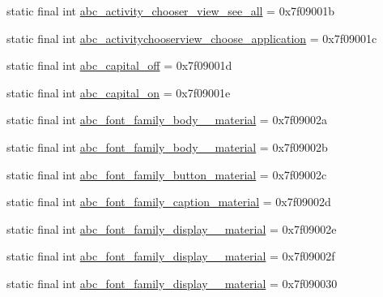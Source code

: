 \begin{CompactItemize}
\item 
static final int \hyperlink{classandroid_1_1support_1_1graphics_1_1drawable_1_1animated_1_1_r_1_1string_b885971c4927ab064f71d939ce11bd88}{abc\_\-activity\_\-chooser\_\-view\_\-see\_\-all} = 0x7f09001b
\item 
static final int \hyperlink{classandroid_1_1support_1_1graphics_1_1drawable_1_1animated_1_1_r_1_1string_f287f7240f2510f1ae238ab19651c831}{abc\_\-activitychooserview\_\-choose\_\-application} = 0x7f09001c
\item 
static final int \hyperlink{classandroid_1_1support_1_1graphics_1_1drawable_1_1animated_1_1_r_1_1string_e082bfb88eac081d210bb8e9a8953b27}{abc\_\-capital\_\-off} = 0x7f09001d
\item 
static final int \hyperlink{classandroid_1_1support_1_1graphics_1_1drawable_1_1animated_1_1_r_1_1string_00e41bfb79c4a250df9bdff37b875159}{abc\_\-capital\_\-on} = 0x7f09001e
\item 
static final int \hyperlink{classandroid_1_1support_1_1graphics_1_1drawable_1_1animated_1_1_r_1_1string_fea045aef656c42af50e96c5ae78eb94}{abc\_\-font\_\-family\_\-body\_\_\-material} = 0x7f09002a
\item 
static final int \hyperlink{classandroid_1_1support_1_1graphics_1_1drawable_1_1animated_1_1_r_1_1string_b42b2c833839b3991b3b28951d0fa976}{abc\_\-font\_\-family\_\-body\_\_\-material} = 0x7f09002b
\item 
static final int \hyperlink{classandroid_1_1support_1_1graphics_1_1drawable_1_1animated_1_1_r_1_1string_2ee1ff876760145ed3f49b2282e43403}{abc\_\-font\_\-family\_\-button\_\-material} = 0x7f09002c
\item 
static final int \hyperlink{classandroid_1_1support_1_1graphics_1_1drawable_1_1animated_1_1_r_1_1string_46761d6ff448e2b407e35d3e160c7803}{abc\_\-font\_\-family\_\-caption\_\-material} = 0x7f09002d
\item 
static final int \hyperlink{classandroid_1_1support_1_1graphics_1_1drawable_1_1animated_1_1_r_1_1string_981b61cbd26b10d30d80351f8b601896}{abc\_\-font\_\-family\_\-display\_\_\-material} = 0x7f09002e
\item 
static final int \hyperlink{classandroid_1_1support_1_1graphics_1_1drawable_1_1animated_1_1_r_1_1string_957fd056ec6c46cdff84e70e910eafdb}{abc\_\-font\_\-family\_\-display\_\_\-material} = 0x7f09002f
\item 
static final int \hyperlink{classandroid_1_1support_1_1graphics_1_1drawable_1_1animated_1_1_r_1_1string_ee1cc31cf07134d264d3c6084377d820}{abc\_\-font\_\-family\_\-display\_\_\-material} = 0x7f090030

\end{CompactItemize}
